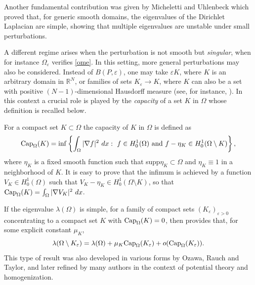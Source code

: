 \documentclass[11pt,reqno]{article}
\numberwithin{equation}{section}
\newcommand\R{\mathbb R}
\newcommand\e\varepsilon
\renewcommand\O\Omega
\begin{document}

 Another fundamental contribution was given by Micheletti \cite{Micheletti} and Uhlenbeck\cite{Uhlenbeck} which proved that, for generic smooth domains, the eigenvalues of the Dirichlet Laplacian are simple, showing that multiple eigenvalues are unstable under small perturbations. 


A different regime arises  when the perturbation is not smooth but {\em singular}, when for instance $\O_\e$ verifies \eqref{ome}.
In this setting, more general perturbations may also be considered. Instead of $B(P,\e)$, one may take $\e K$, where $K$ is an arbitrary domain in $\R^N$, or families of sets $K_\e \to K$, where $K$ can also be a set with positive $(N-1)$-dimensional Hausdorff measure (see, for instance, \cite{afhl}). 
In this context a crucial role is played by the {\em capacity} of a set $K$ in $\O$ whose definition is recalled below.

For a compact set $K\subset\O$ the capacity of $K$ in $\O$ is defined as 
    \begin{equation}\label{defCap2}
        \hbox{Cap}_\O(K)=\inf \left\{\int_\O |\nabla f|^2\ dx:\ f\in H^1_0 (\O) \ \hbox{and}\ f-\eta_K\in H_0^1(\O\setminus K) \right\},
    \end{equation}
    where $\eta_K$ is a fixed smooth function such that supp$\eta_K\subset\O$ and $\eta_K\equiv1$ in a neighborhood of $K$. It is easy to prove that the infimum is achieved by a function $V_K\in H_0^1(\O)$ such that $V_K-\eta_K\in H_0^1(\O\setminus K)$, so that $\hbox{Cap}_\O(K)=\int_\O |\nabla V_K|^2\ dx$.

 If the eigenvalue $\lambda(\O)$ is simple, for a family of compact sets $(K_\e)_{\e>0}$  concentrating to a compact set $K$ with $\hbox{Cap}_\O(K)=0$, then  \cite[Theorem 1.2]{Courtois1995}  provides that, for some explicit constant $\mu_K$,
    \begin{equation}\label{eq-afh-1.4}
        \lambda(\O\setminus K_\e)=\lambda(\O)+\mu_K\hbox{Cap}_\O(K_\e)+o(\hbox{Cap}_\O(K_\e)).
    \end{equation}
This type of result was also developed in various forms by Ozawa, Rauch and Taylor, and later refined by many authors in the context of potential theory and homogenization. %
\end{document}
